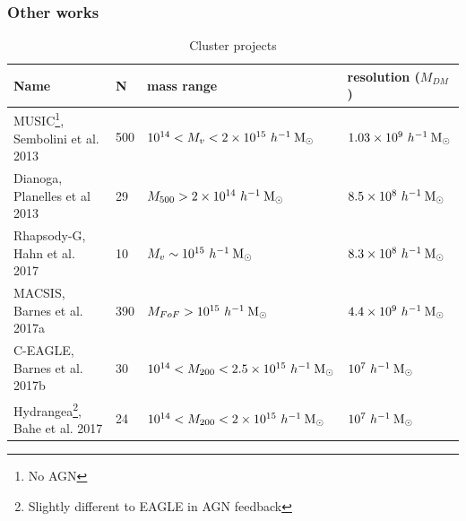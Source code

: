 \documentclass[aspectratio=43]{beamer}
\newcommand{\hMsun}{~h^{-1}\>{\rm M_\odot}}
\begin{document}
\begin{frame}
  \frametitle{Other works}
  \begin{table}
    \fontsize{7}{7}\selectfont
    \caption{Cluster projects}
    \begin{tabular}{llll}
      \hline
      Name & N & mass range & resolution ($M_{DM}$)\\
      \hline
      MUSIC\footnote{No AGN}, Sembolini et al. 2013 & 500 & $10^{14} < M_v < 2\times10^{15} \hMsun$ & $1.03\times 10^9 \hMsun$ \\
      Dianoga, Planelles et al 2013 & 29 & $M_{500} > 2\times10^{14} \hMsun$ & $8.5\times 10^8 \hMsun$\\
      Rhapsody-G, Hahn et al. 2017 & 10 & $M_v \sim 10^{15} \hMsun$ & $8.3\times 10^8 \hMsun$\\
      MACSIS,  Barnes et al. 2017a & 390 & $M_{FoF} > 10^{15} \hMsun$ & $4.4\times 10^9 \hMsun$\\
      C-EAGLE, Barnes et al. 2017b & 30 & $10^{14} < M_{200} < 2.5\times10^{15} \hMsun$ & $10^7 \hMsun$\\
      Hydrangea\footnote{Slightly different to EAGLE in AGN feedback}, Bahe et al. 2017 & 24 & $10^{14} < M_{200} < 2\times10^{15} \hMsun$ & $10^7 \hMsun$\\
      \hline
    \end{tabular}
  \end{table}
\end{frame}
\end{document}
